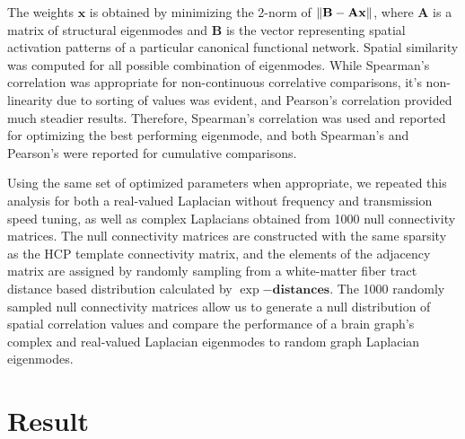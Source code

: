 \documentclass{article}
\begin{document}
The weights $\mathbf{x}$ is obtained by minimizing the 2-norm of $\mathbf{\norm{B-Ax}}$, where $\mathbf{A}$ is a matrix of structural eigenmodes and $\mathbf{B}$ is the vector representing spatial activation patterns of a particular canonical functional network. Spatial similarity was computed for all possible combination of eigenmodes. While Spearman's correlation was appropriate for non-continuous correlative comparisons, it's non-linearity due to sorting of values was evident, and Pearson's correlation provided much steadier results. Therefore, Spearman's correlation was used and reported for optimizing the best performing eigenmode, and both Spearman's and Pearson's were reported for cumulative comparisons.

Using the same set of optimized parameters when appropriate, we repeated this analysis for both a real-valued Laplacian without frequency and transmission speed tuning, as well as complex Laplacians obtained from 1000 null connectivity matrices. The null connectivity matrices are constructed with the same sparsity as the HCP template connectivity matrix, and the elements of the adjacency matrix are assigned by randomly sampling from a white-matter fiber tract distance based distribution calculated by $\exp{-\mathbf{distances}}$. The 1000 randomly sampled null connectivity matrices allow us to generate a null distribution of spatial correlation values and compare the performance of a brain graph's complex and real-valued Laplacian eigenmodes to random graph Laplacian eigenmodes.

\section{Result}
\end{document}
